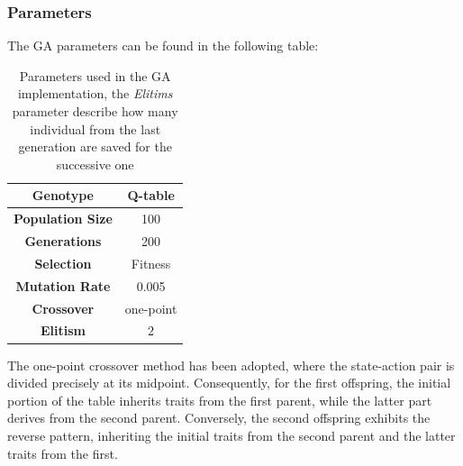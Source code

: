 \subsubsection{Parameters}
The GA parameters can be found in the following table:
\begin{table}[htb]%
	\centering
	\begin{tabular}{|S|S|} 		%
		
		\hline
		{\textbf{Genotype}} &  {Q-table} \\
		\hline
		{\textbf{Population Size}} & {100} \\
		\hline
		{\textbf{Generations}} & {200} \\
		\hline
		{\textbf{Selection}}  & {Fitness} \\
		\hline
		{\textbf{Mutation Rate}} & {0.005} \\
		\hline
		{\textbf{Crossover}}& {one-point} \\
		\hline
		{\textbf{Elitism}}&  {2}  \\
		\hline

	\end{tabular}
	\caption{Parameters used in the GA implementation, the \textit{Elitims} parameter describe how many individual from the last generation are saved for the successive one}
	\label{tab:GA_parameters}
\end{table}

The one-point crossover method has been adopted, where the state-action pair is divided precisely at its midpoint. Consequently, for the first offspring, the initial portion of the table inherits traits from the first parent, while the latter part derives from the second parent. Conversely, the second offspring exhibits the reverse pattern, inheriting the initial traits from the second parent and the latter traits from the first.

